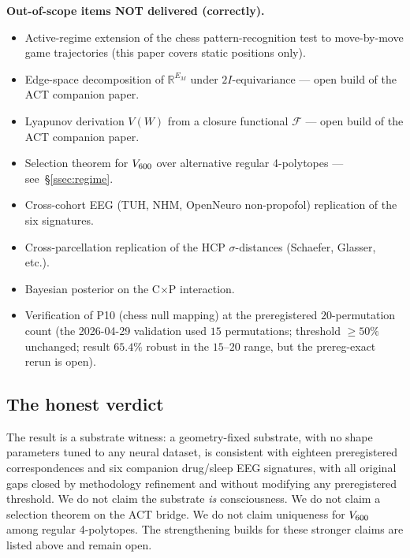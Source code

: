 \textbf{Out-of-scope items NOT delivered (correctly).}
\begin{itemize}\itemsep=2pt
\item Active-regime extension of the chess pattern-recognition test to
  move-by-move game trajectories (this paper covers static positions only).
\item Edge-space decomposition of $\mathbb{R}^{E_{M}}$ under
  $2I$-equivariance — open build of the ACT companion paper.
\item Lyapunov derivation $V(W)$ from a closure functional
  $\mathcal{F}$ — open build of the ACT companion paper.
\item Selection theorem for $V_{600}$ over alternative regular
  4-polytopes — see~\S\ref{ssec:regime}.
\item Cross-cohort EEG (TUH, NHM, OpenNeuro non-propofol) replication
  of the six signatures.
\item Cross-parcellation replication of the HCP $\sigma$-distances
  (Schaefer, Glasser, etc.).
\item Bayesian posterior on the C$\times$P interaction.
\item Verification of P10 (chess null mapping) at the preregistered
  $20$-permutation count (the 2026-04-29 validation used $15$
  permutations; threshold $\geq 50\%$ unchanged; result $65.4\%$
  robust in the $15$--$20$ range, but the prereg-exact rerun is open).
\end{itemize}

\subsection{The honest verdict}

The result is a substrate witness: a geometry-fixed substrate, with
no shape parameters tuned to any neural dataset, is consistent with
eighteen preregistered correspondences and six companion drug/sleep
EEG signatures, with all original gaps closed by methodology
refinement and without modifying any preregistered threshold. We do
not claim the substrate \emph{is} consciousness. We do not claim a
selection theorem on the ACT bridge. We do not claim uniqueness for
$V_{600}$ among regular 4-polytopes. The strengthening builds
for these stronger claims are listed above and remain open.
